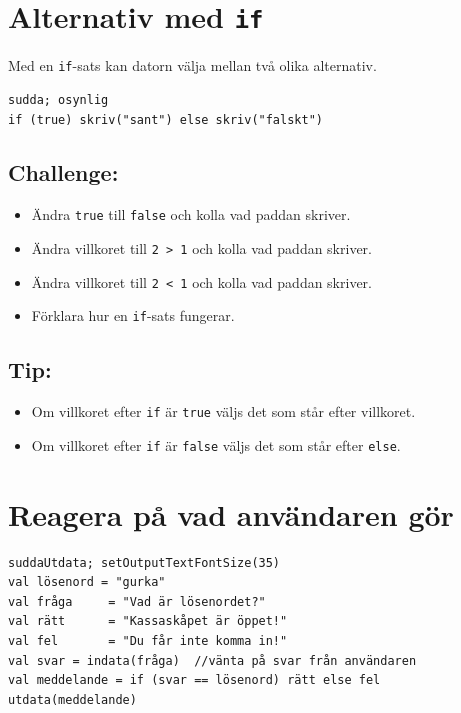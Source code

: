 \chapter{Alternativ med \lstinline{if}}Med en \lstinline{if}-sats kan datorn välja mellan två olika alternativ.

\begin{lstlisting}[basicstyle={\ttfamily\fontsize{20}{24}\selectfont},numbers=none]
sudda; osynlig
if (true) skriv("sant") else skriv("falskt")
\end{lstlisting}
        
\section*{\color{BrickRed}Challenge:}


\begin{itemize}

\item {Ändra \lstinline{true} till \lstinline{false} och kolla vad paddan skriver.}
\item {Ändra villkoret till \lstinline{2 > 1} och kolla vad paddan skriver.}
\item {Ändra villkoret till \lstinline{2 < 1} och kolla vad paddan skriver.}
\item {Förklara hur en \lstinline{if}-sats fungerar.}

\end{itemize}


\section*{\color{OliveGreen}Tip:}


\begin{itemize}

\item {Om villkoret efter \lstinline{if} är \lstinline{true} väljs det som står efter villkoret.}
\item {Om villkoret efter \lstinline{if} är \lstinline{false} väljs det som står efter \lstinline{else}.}

\end{itemize}


\chapter{Reagera på vad användaren gör}
\begin{lstlisting}[basicstyle={\ttfamily\fontsize{20}{24}\selectfont},numbers=none]
suddaUtdata; setOutputTextFontSize(35)
val lösenord = "gurka"
val fråga     = "Vad är lösenordet?"
val rätt      = "Kassaskåpet är öppet!"
val fel       = "Du får inte komma in!"
val svar = indata(fråga)  //vänta på svar från användaren
val meddelande = if (svar == lösenord) rätt else fel
utdata(meddelande)
\end{lstlisting}
        
